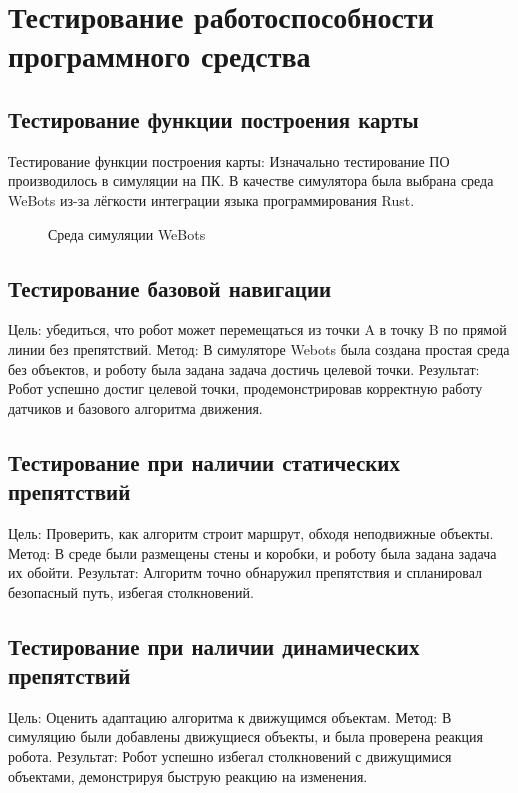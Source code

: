 \section{Тестирование работоспособности программного средства}

\subsection{Тестирование функции построения карты}
Тестирование функции построения карты:
Изначально тестирование ПО производилось в симуляции на ПК. В качестве симулятора была выбрана среда WeBots
из-за лёгкости интеграции языка программирования Rust.


\begin{figure}[H]
\centering
\caption{Среда симуляции WeBots}
\label{fig:components}
\end{figure}


\subsection{Тестирование базовой навигации}
Цель: убедиться, что робот может перемещаться из точки A в точку B по прямой линии без препятствий.
Метод: В симуляторе Webots была создана простая среда без объектов, и роботу была задана задача достичь целевой точки.
Результат: Робот успешно достиг целевой точки, продемонстрировав корректную работу датчиков и базового алгоритма движения.

\subsection{Тестирование при наличии статических препятствий}
Цель: Проверить, как алгоритм строит маршрут, обходя неподвижные объекты.
Метод: В среде были размещены стены и коробки, и роботу была задана задача их обойти.
Результат: Алгоритм точно обнаружил препятствия и спланировал безопасный путь, избегая столкновений.

\subsection{Тестирование при наличии динамических препятствий}
Цель: Оценить адаптацию алгоритма к движущимся объектам.
Метод: В симуляцию были добавлены движущиеся объекты, и была проверена реакция робота.
Результат: Робот успешно избегал столкновений с движущимися объектами, демонстрируя быструю реакцию на изменения.

